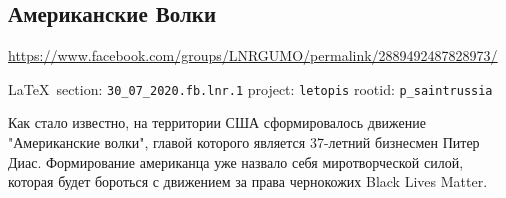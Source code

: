 
 
\subsection{Американские Волки}
\url{https://www.facebook.com/groups/LNRGUMO/permalink/2889492487828973/}
  
\vspace{0.5cm}
{\small\LaTeX~section: \verb|30_07_2020.fb.lnr.1| project: \verb|letopis| rootid: \verb|p_saintrussia|}
\vspace{0.5cm}
  
Как стало известно, на территории США сформировалось движение "Американские
волки", главой которого является 37-летний бизнесмен Питер Диас. Формирование
американца уже назвало себя миротворческой силой, которая будет бороться с
движением за права чернокожих Black Lives Matter.
